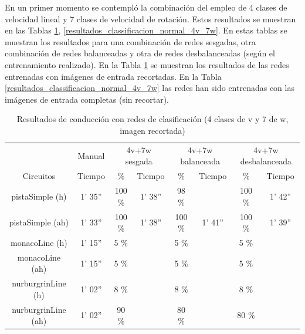 En un primer momento se contempló la combinación del empleo de 4 clases de velocidad lineal y 7 clases de velocidad de rotación. Estos resultados se muestran en las Tablas \ref{resultados_classificacion_recortada_4v_7w}, \ref{resultados_classificacion_normal_4v_7w}. En estas tablas se muestran los resultados para una combinación de redes sesgadas, otra combinación de redes balanceadas y otra de redes desbalanceadas (según el entrenamiento realizado). En la Tabla \ref{resultados_classificacion_recortada_4v_7w} se muestran los resultados de las redes entrenadas con imágenes de entrada recortadas. En la Tabla \ref{resultados_classificacion_normal_4v_7w} las redes han sido entrenadas con las imágenes de entrada completas (sin recortar).\\

\begin{table}[H]
\centering
\caption{Resultados de conducción con redes de clasificación (4 clases de v y 7 de w, imagen recortada)}
\label{resultados_classificacion_recortada_4v_7w}
\begin{tabular}{c|c|c|c|c|c|c|c|}
\cline{2-8}
                          & \multicolumn{1}{c|}{Manual} & \multicolumn{2}{c|}{4v+7w sesgada} & \multicolumn{2}{c|}{4v+7w balanceada} & \multicolumn{2}{c|}{4v+7w desbalanceada} \\ \cline{1-8} 
                        \multicolumn{1}{|c|}{Circuitos}    & Tiempo       & \%       & Tiempo       & \%        & Tiempo       & \%      & Tiempo     \\ \hline
\multicolumn{1}{|c|}{pistaSimple (h)}    & 1' 35''           & 100 \%         & 1' 38''           & 98 \%          &            & 100 \%       & 1' 42''      \\ \hline
\multicolumn{1}{|c|}{pistaSimple (ah)}     & 1' 33''           & 100 \%          & 1' 38''            & 100 \%           & 1' 41''           & 100 \%       & 1' 39''       \\ \hline
\multicolumn{1}{|c|}{monacoLine (h)}      & 1' 15''           & 5 \%           &             & 5 \%       &             & 5 \%       &           \\ \hline
\multicolumn{1}{|c|}{monacoLine (ah)}       & 1' 15''            & 5 \%       &             & 5 \%           &             & 5 \%          &      \\ \hline
\multicolumn{1}{|c|}{nurburgrinLine (h)}      & 1' 02''            & 8 \%          &            & 8 \%        &           & 8 \%       &     \\ \hline
\multicolumn{1}{|c|}{nurburgrinLine (ah)}       & 1' 02''           & 90 \%           &           & 80 \%        &            & 80 \%       &       \\ \hline

\end{tabular}
\end{table}
